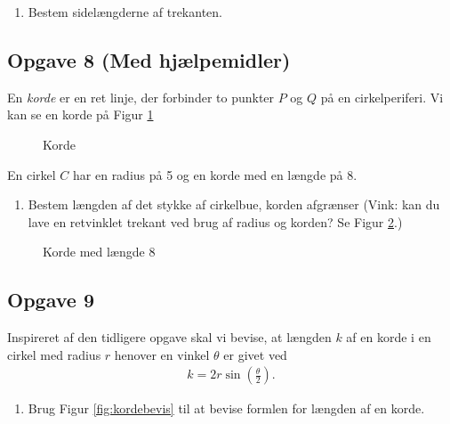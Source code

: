 \begin{enumerate}[label=\roman*)]
	\item Bestem sidelængderne af trekanten.
\end{enumerate}

\subsection*{Opgave 8 (Med hjælpemidler)}
En \textit{korde} er en ret linje, der forbinder to punkter $P$ og $Q$ på en cirkelperiferi. Vi kan se en korde på Figur \ref{fig:korde}
\begin{figure}[H]
	\centering
	\caption{Korde}
	\label{fig:korde}
\end{figure}

En cirkel $C$ har en radius på 5 og en korde med en længde på 8. 
\begin{enumerate}[label=\roman*)]
	\item Bestem længden af det stykke af cirkelbue, korden afgrænser (Vink: kan du lave en retvinklet trekant ved brug
	af radius og korden? Se Figur \ref{fig:kordeopg}.)
\end{enumerate}
\begin{figure}[H]
	\centering
	\caption{Korde med længde 8}
	\label{fig:kordeopg}
\end{figure}

\subsection*{Opgave 9}
Inspireret af den tidligere opgave skal vi bevise, at længden $k$ af en korde i en cirkel med radius $r$ henover en vinkel $\theta$ er givet ved
\begin{align*}
	k = 2r\sin\left(\frac{\theta}{2}\right).
\end{align*}
\begin{enumerate}[label=\roman*)]
	\item Brug Figur \ref{fig:kordebevis} til at bevise formlen for længden af en korde.
\end{enumerate}


